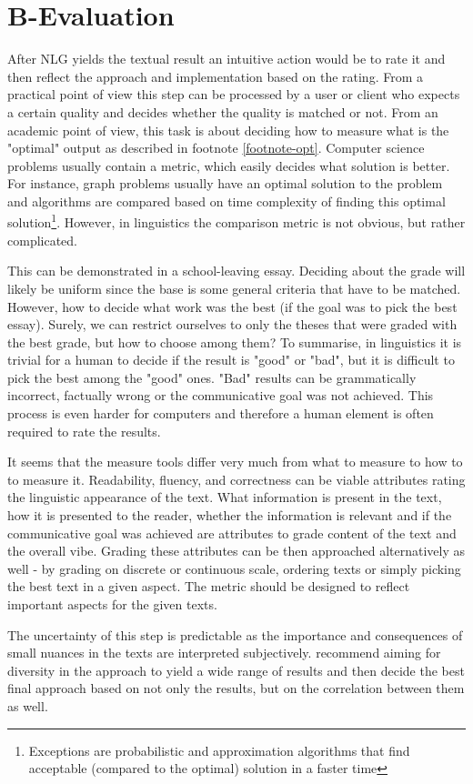 \section{B-Evaluation}
After NLG yields the textual result an intuitive action would be to rate it and then reflect the approach and implementation based on the rating. From a practical point of view this step can be processed by a user or client who expects a certain quality and decides whether the quality is matched or not. From an academic point of view, this task is about deciding how to measure what is the "optimal" output as described in footnote \ref{footnote-opt}. Computer science problems usually contain a metric, which easily decides what solution is better. For instance, graph problems usually have an optimal solution to the problem and algorithms are compared based on time complexity of finding this optimal solution\footnote{Exceptions are probabilistic and approximation algorithms that find acceptable (compared to the optimal) solution in a faster time}. However, in linguistics the comparison metric is not obvious, but rather complicated.

This can be demonstrated in a school-leaving essay. Deciding about the grade will likely be uniform since the base is some general criteria that have to be matched. However, how to decide what work was the best (if the goal was to pick the best essay). Surely, we can restrict ourselves to only the theses that were graded with the best grade, but how to choose among them? To summarise, in linguistics it is trivial for a human to decide if the result is "good" or "bad", but it is difficult to pick the best among the "good" ones. "Bad" results can be grammatically incorrect, factually wrong or the communicative goal was not achieved. This process is even harder for computers and therefore a human element is often required to rate the results. 

It seems that the measure tools differ very much from what to measure to how to to measure it. Readability, fluency, and correctness can be viable attributes rating the linguistic appearance of the text. What information is present in the text, how it is presented to the reader, whether the information is relevant and if the communicative goal was achieved are attributes to grade content of the text and the overall vibe. Grading these attributes can be then approached alternatively as well - by grading on discrete or continuous scale, ordering texts or simply picking the best text in a given aspect. The metric should be designed to reflect important aspects for the given texts.

The uncertainty of this step is predictable as the importance and consequences of small nuances in the texts are interpreted subjectively. \cite{gatt2018survey} recommend aiming for diversity in the approach to yield a wide range of results and then decide the best final approach based on not only the results, but on the correlation between them as well.

